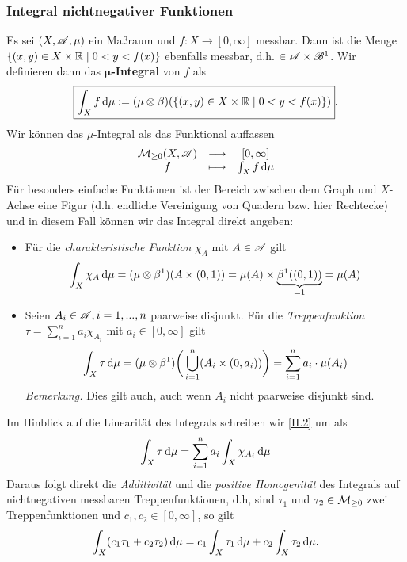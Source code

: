 \subsubsection{Integral nichtnegativer Funktionen}
Es sei $(X,\AA,\mu)$ ein Maßraum und $f: X \longrightarrow [0,\infty]$ messbar. Dann ist die Menge $\{(x,y)\in X \times \R \mid 0<y<f(x)\}$ ebenfalls messbar, d.h. $\in \AA \times \BB^1$. Wir definieren dann das \textbf{$\boldsymbol{\mu}$-Integral} von $f$ als 
\begin{equation}
\boxed{\int_X f \D \mu := (\mu \otimes \beta) (\{(x,y) \in X \times \R \mid 0<y<f(x)\})}.
\end{equation}
Wir können das $\mu$-Integral als das Funktional auffassen
\begin{equation*}
\begin{array}{ccc}
\MM_{\geq 0}(X,\AA) & \longrightarrow & [0,\infty]\\
f & \longmapsto & \int_X f \D \mu
\end{array}
\end{equation*}
Für besonders einfache Funktionen ist der Bereich zwischen dem Graph und $X$-Achse eine Figur (d.h. endliche Vereinigung von Quadern bzw. hier Rechtecke) und in diesem Fall können wir das Integral direkt angeben:
\begin{itemize}
\item Für die \emph{charakteristische Funktion} $\chi_A$ mit $A \in \AA$ gilt
$$
\int_X \chi_A \D \mu = (\mu \otimes \beta^1) (A \times (0,1)) = \mu (A) \times \underbrace{\beta^1 ((0,1))}_{=1}=\mu(A)
$$
\item Seien $A_i \in \AA, i=1,...,n$ paarweise disjunkt. Für die \emph{Treppenfunktion} $\tau = \sum\limits_{i=1}^n a_i \chi_{A_i}$ mit $a_i \in [0,\infty]$ gilt
\begin{equation}\label{II.2}
\int_X \tau \D \mu = (\mu \otimes \beta^1) \bigg( \bigcup_{i=1}^n (A_i \times (0,a_i))\bigg)=\sum_{i=1}^n a_i \cdot \mu(A_i)
\end{equation}
\textit{Bemerkung.} Dies gilt auch, auch wenn $A_i$ nicht paarweise disjunkt sind.
\end{itemize}
Im Hinblick auf die Linearität des Integrals schreiben wir \eqref{II.2} um als
$$
\int_X \tau \D \mu = \sum_{i=1}^n a_i \int_X \chi_{A_i} \D \mu
$$
Daraus folgt direkt die \emph{Additivität} und die \emph{positive Homogenität} des Integrals auf nichtnegativen messbaren Treppenfunktionen, d.h, sind $\tau_1$ und $\tau_2 \in \MM_{\geq 0}$ zwei Treppenfunktionen und $c_1,c_2 \in [0,\infty]$, so gilt
\begin{equation*}
\begin{split}
\int_X (c_1\tau_1+c_2\tau_2)\D \mu = c_1 \int_X \tau_1 \D \mu +c_2 \int_X \tau_2 \D \mu.
\end{split}
\end{equation*}
